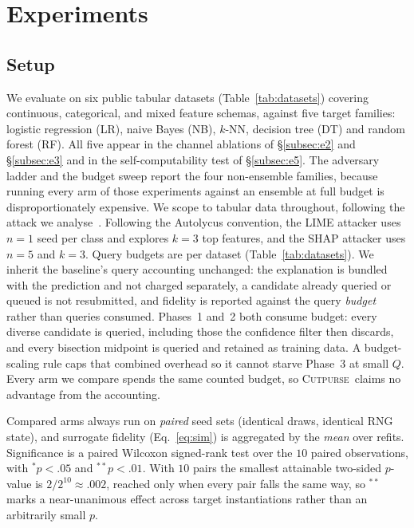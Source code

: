 \documentclass[sigconf,anonymous,review]{acmart}
\newcommand{\sys}{\textsc{Cutpurse}}
\begin{document}
\section{Experiments}
\label{sec:experiments}
\subsection{Setup}
\label{subsec:setup}
We evaluate on six public tabular datasets (Table~\ref{tab:datasets}) covering continuous,
categorical, and mixed feature schemas, against five target families: logistic regression (LR), naive
Bayes (NB), $k$-NN, decision tree (DT) and random forest (RF). All five appear in the channel
ablations of \S\ref{subsec:e2} and \S\ref{subsec:e3} and in the self-computability test of
\S\ref{subsec:e5}. The adversary ladder and the budget sweep report the four non-ensemble families,
because running every arm of those experiments against an ensemble at full budget is
disproportionately expensive. We scope to tabular data throughout,
following the attack we analyse~\cite{oksuz2024autolycus}. Following the Autolycus convention, the
LIME attacker uses $n{=}1$
seed per class and explores $k{=}3$ top features, and the SHAP attacker uses $n{=}5$ and $k{=}3$.
Query budgets are per dataset (Table~\ref{tab:datasets}). We inherit the baseline's query
accounting unchanged: the explanation is bundled with the prediction and not charged separately, a
candidate already queried or queued is not resubmitted, and fidelity is reported against the query
\emph{budget} rather than queries consumed. Phases~1 and~2 both consume budget: every diverse
candidate is queried, including those the confidence filter then discards, and every bisection
midpoint is queried and retained as training data. A budget-scaling rule caps that combined overhead
so it cannot starve Phase~3 at small $Q$. Every arm we compare spends the same counted budget, so
\sys\ claims no advantage from the accounting.

Compared arms always run on \emph{paired} seed sets (identical draws, identical RNG state), and
surrogate fidelity (Eq.~\ref{eq:sim}) is aggregated by the \emph{mean} over refits. Significance is a
paired Wilcoxon signed-rank test over the $10$ paired observations, with $^{*}p{<}.05$ and
$^{**}p{<}.01$. With $10$ pairs the smallest attainable two-sided $p$-value is $2/2^{10}\approx.002$,
reached only when every pair falls the same way, so $^{**}$ marks a near-unanimous effect across
target instantiations rather than an arbitrarily small $p$.
\end{document}
